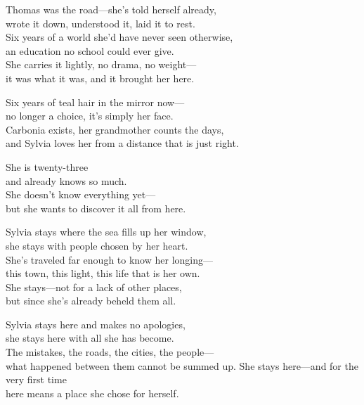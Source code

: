 \begin{lyrics}
Thomas was the road—she’s told herself already,\\
wrote it down, understood it, laid it to rest.\\
Six years of a world she’d have never seen otherwise,\\
an education no school could ever give.\\
She carries it lightly, no drama, no weight—\\
it was what it was, and it brought her here.

Six years of teal hair in the mirror now—\\
no longer a choice, it’s simply her face.\\
Carbonia exists, her grandmother counts the days,\\
and Sylvia loves her from a distance that is just right.

She is twenty-three\\
and already knows so much.\\
She doesn’t know everything yet—\\
but she wants to discover it all from here.

Sylvia stays where the sea fills up her window,\\
she stays with people chosen by her heart.\\
She’s traveled far enough to know her longing—\\
this town, this light, this life that is her own.\\
She stays—not for a lack of other places,\\
but since she’s already beheld them all.

Sylvia stays here and makes no apologies,\\
she stays here with all she has become.\\
The mistakes, the roads, the cities, the people—\\
what happened between them cannot be summed up.
She stays here—and for the very first time\\
here means a place she chose for herself.

\end{lyrics}

